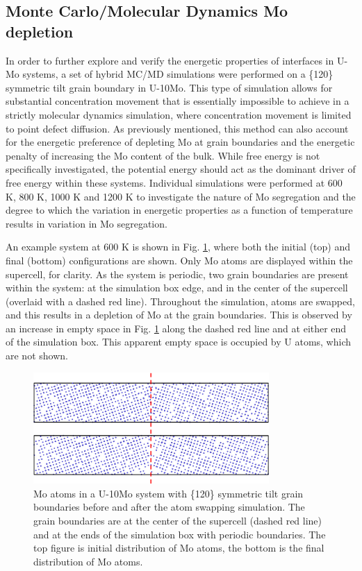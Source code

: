 \documentclass[review]{elsarticle}
\begin{document}
\subsection{Monte Carlo/Molecular Dynamics Mo depletion}
In order to further explore and verify the energetic properties of interfaces in U-Mo systems, a set of hybrid MC/MD simulations were performed on a \{120\} symmetric tilt grain boundary in U-10Mo. This type of simulation allows for substantial concentration movement that is essentially impossible to achieve in a strictly molecular dynamics simulation, where concentration movement is limited to point defect diffusion. As previously mentioned, this method can also account for the energetic preference of depleting Mo at grain boundaries and the energetic penalty of increasing the Mo content of the bulk. While free energy is not specifically investigated, the potential energy should act as the dominant driver of free energy within these systems. Individual simulations were performed at 600 K, 800 K, 1000 K and 1200 K to investigate the nature of Mo segregation and the degree to which the variation in energetic properties as a function of temperature results in variation in Mo segregation. 

An example system at 600 K is shown in Fig. \ref{fig:600mcmd}, where both the initial (top) and final (bottom) configurations are shown. Only Mo atoms are displayed within the supercell, for clarity. As the system is periodic, two grain boundaries are present within the system: at the simulation box edge, and in the center of the supercell (overlaid with a dashed red line). Throughout the simulation, atoms are swapped, and this results in a depletion of Mo at the grain boundaries. This is observed by an increase in empty space in Fig. \ref{fig:600mcmd} along the dashed red line and at either end of the simulation box. This apparent empty space is occupied by U atoms, which are not shown.

\begin{figure}[h]
 \centering
 \includegraphics[width=0.8\textwidth]{600mcmd.png} 
 \caption{Mo atoms in a U-10Mo system with \{120\} symmetric tilt grain boundaries before and after the atom swapping simulation. The grain boundaries are at the center of the supercell (dashed red line) and at the ends of the simulation box with periodic boundaries. The top figure is initial distribution of Mo atoms, the bottom is the final distribution of Mo atoms.}
 \label{fig:600mcmd}
\end{figure}
\end{document}

